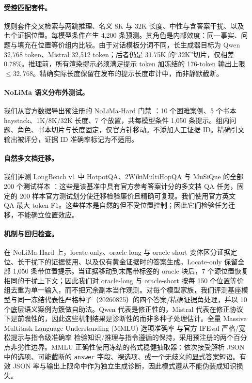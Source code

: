 \documentclass[11pt]{article}
\begin{document}
\paragraph{受控匹配套件。}
规则套件交叉检索与两跳推理、名义 8K 与 32K 长度、中性与含答案干扰、以及七个证据位置。每模型条件产生 4,200 条预测。其角色是内部效度：同一事实、问题与填充在位置等价组内比较。由于对话模板分词不同，长生成器目标为 Qwen 32,768 token、Mistral 32,512 token；后者仍是 31.75K 的``32K''切片，仅相差 0.78\%。推理前，所有渲染提示必须满足提示 token 加冻结的 176-token 输出上限 $\leq 32{,}768$。精确实际长度保留在发布的提示长度审计中，而非静默截断。

\paragraph{NoLiMa 语义分布外测试。}
我们从官方数据导出预注册的 NoLiMa-Hard 门禁 \citep{modarressi2025nolima}：10 个困难案例、5 个书本 haystack、1K/8K/32K 长度、7 个放置，共每模型条件 1,050 条提示。组内问题、角色、书本切片与长度固定，仅官方针移动。不添加人工证据 ID。精确引文输出被评分，证据 ID 准确率标记为不适用。

\paragraph{自然多文档迁移。}
我们评测 LongBench v1 中 HotpotQA、2WikiMultiHopQA 与 MuSiQue 的全部 200 个测试样本 \citep{bai2024longbench}：这些是该基准中具有官方参考答案计分的多文档 QA 任务，固定的 200 样本官方测试划分使迁移检验廉价且精确可复现。我们使用官方英文 QA 最大 token-F1。这些样本是自然的但不受位置控制；因此它们检验任务迁移，不能确立位置效应。

\paragraph{机制与回归检查。}
在 NoLiMa-Hard 上，locate-only、oracle-long 与 oracle-short 变体区分证据定位、长干扰下的证据使用、以及仅有黄金证据时的答案生成。Locate-only 保留全部 1,050 条带位置提示。当证据移动到末尾带标签的 oracle 块后，7 个源位置恢复相同的干扰上下文；因此我们对 oracle-long 与 oracle-short 按每 150 个位置等价组去重为单一输入，而不把冗余副本当作观测。对每个模型家族，我们评测基座模型与同一冻结代表性严格种子（20260825）的四个答案/精确证据角处理，并以 10 个底层语义案例为簇做自助法。Qwen 代表是修正性的，Mistral 代表在修正协议下是前瞻性的，因此这些机制结果是诊断性的而非多种子处理估计。全量 Massive Multitask Language Understanding (MMLU) 选项准确率 \citep{hendrycks2021mmlu} 与官方 IFEval 严格/宽松提示与指令级准确率 \citep{zhou2023ifeval} 检验知识/推理与指令遵循的保持，采用预注册的两个百分点非劣性边界。MMLU 正确性使用冻结的格式稳健抽取器：依次接受解析 JSON 中的选项、可能截断的 \texttt{answer} 字段、裸选项、或一个无歧义的显式答案短语。有效 JSON 率与输出上限命中作为独立生成诊断，因此模式遵从不能伪装成知识损失。
\end{document}
